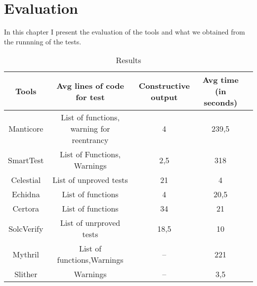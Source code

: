 
\chapter{Evaluation}
\label{ch:Evaluation}

In this chapter I present the evaluation of the tools and what we obtained from the runnning of the tests.

\begin{table*}
    \footnotesize
    \caption{Results}
    \label{tab:Results}
    \begin{tabular}{ccccl}
    \toprule
     Tools  &  Avg lines of code for test &  Constructive output & Avg time (in seconds) \\
      \midrule
        Manticore & List of functions, warning for reentrancy  & 4  &  239,5 \\
        SmartTest & List of Functions, Warnings  & 2,5 &  318  \\
        Celestial & List of unproved tests & 21  &  4  \\
        Echidna & List of functions  & 4  & 20,5 \\
        Certora & List of functions   & 34 &  21  \\ 
        SolcVerify & List of unrproved tests  &  18,5 &  10  \\
        Mythril & List of functions,Warnings  & --  &  221  \\ 
        Slither& Warnings & --  &  3,5  \\ 
    \bottomrule
    \end{tabular}
\end{table*}

